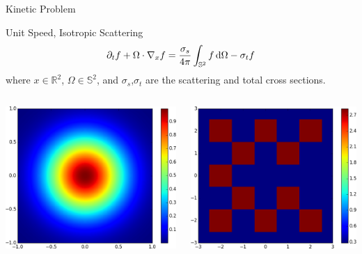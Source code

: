 \documentclass{beamer}
\renewcommand{\vec}[1]{\ensuremath{#1}}
\newcommand{\integral}[1]{\ensuremath{\int_{\mathbb{S}^2} #1 \dif \Omega}}
\newcommand{\R}{\ensuremath{\mathbb{R}}\xspace}
\begin{document}
    \begin{frame}{Kinetic Problem}
        \begin{block}{Unit Speed, Isotropic Scattering}
            \begin{equation*}
                \partial_t f + \Omega \cdot \nabla_\vec{x} f = \frac{\sigma_s}{4\pi} \integral{f} - \sigma_t f
            \end{equation*}
            where $x \in \R^2$, $\Omega \in \mathbb{S}^2$, and $\sigma_s$,$\sigma_t$ are the scattering and total cross sections.
        \end{block}

        \vfill

        \begin{columns}
            \centering
            \includegraphics[width=\textwidth]{initcond_gaussian.png}

            \centering
            \includegraphics[width=\textwidth]{initcond_lattice-t.png}


\end{columns}
\end{frame}
\end{document}
